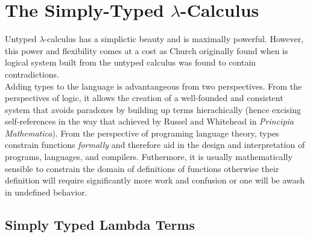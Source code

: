 \documentclass[12pt]{article}
\begin{document}
\section{The Simply-Typed $\lambda$-Calculus}

Untyped $\lambda$-calculus has a simplictic beauty and is maximally powerful. However, this power and flexibility comes at a cost as Church originally found when is logical system built from the untyped calculus was found to contain contradictions. 
\bigskip\\
Adding types to the language is advantangeous from two perspectives. From the perspectives of logic, it allows the creation of a well-founded and consistent system that avoids paradoxes by building up terms hierachically (hence excising self-references in the way that achieved by Russel and Whitehead in \textit{Principia Mathematica}). From the perspective of programing language theory, types constrain functions \textit{formally} and therefore aid in the design and interpretation of programs, languages, and compilers. Futhermore, it is usually mathematically sensible to constrain the domain of definitions of functions otherwise their definition will require significantly more work and confusion or one will be awash in undefined behavior. 


\subsection{Simply Typed Lambda Terms}
\end{document}

